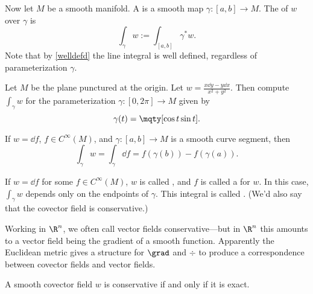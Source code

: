 \begin{defn}[]
    Now let $M$ be a smooth manifold. A  is a smooth map $\gamma \colon [a,b] \to M$. The  of $w$ over $\gamma$ is
    \begin{equation*}
        \int_\gamma w := \int_{[a,b]} \gamma^* w.
    \end{equation*}
    Note that by \ref{welldefd} the line integral is well defined, regardless of parameterization $\gamma$.
\end{defn}

\begin{todo}[]
   \label{punctured}
    Let $M$ be the plane punctured at the origin. Let $w = \frac{x \dd{y} - y \dd{x} }{x^2 + y^2}$. Then compute $\int_\gamma w$ for the parameterization $\gamma \colon [0, 2\pi] \to M$ given by 
    \begin{equation*}
        \gamma(t) = \mqty[\cos t\\ \sin t].
    \end{equation*}
\end{todo}

\begin{thm}
    If $w = \dd{f}$, $f \in C^\infty(M)$, and $\gamma \colon [a,b]\to M$ is a smooth curve segment, then 
    \begin{equation*}
        \int_\gamma w = \int_\gamma \dd{f} = f(\gamma(b)) - f(\gamma(a)).
    \end{equation*}
\end{thm}

\begin{defn}
    If $w = \dd{f}$ for some $f \in C^\infty(M)$, $w$ is called , and $f$ is called a  for $w$. In this case, $\int_\gamma w$ depends only on the endpoints of $\gamma$. This integral is called . (We'd also say that the covector field is conservative.)
\end{defn}

    Working in $\R^n$, we often call vector fields conservative---but in $\R^n$ this amounts to a vector field being the gradient of a smooth function. Apparently the Euclidean metric gives a structure for $\grad$ and $\div$ to produce a correspondence between covector fields and vector fields.

\begin{thm}[]
    A smooth covector field $w$ is conservative if and only if it is exact.
\end{thm}

